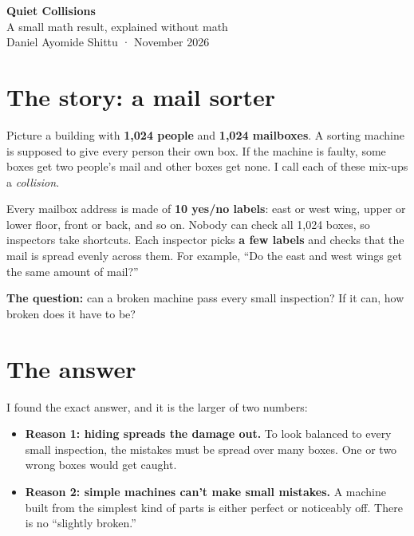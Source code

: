 \documentclass[11pt]{article}
\begin{document}
\pagestyle{empty}

{\LARGE\bfseries Quiet Collisions}\\[3pt]
{\large A small math result, explained without math}\\[2pt]
{\small Daniel Ayomide Shittu \;·\; November 2026}

\vspace{6pt}
\section*{The story: a mail sorter}

Picture a building with \textbf{1{,}024 people} and \textbf{1{,}024 mailboxes}.
A sorting machine is supposed to give every person their own box. If the
machine is faulty, some boxes get two people's mail and other boxes get none.
I call each of these mix-ups a \emph{collision}.

Every mailbox address is made of \textbf{10 yes/no labels}: east or west wing,
upper or lower floor, front or back, and so on. Nobody can check all 1{,}024
boxes, so inspectors take shortcuts. Each inspector picks \textbf{a few labels}
and checks that the mail is spread evenly across them. For example, ``Do the
east and west wings get the same amount of mail?''

\textbf{The question:} can a broken machine pass every small inspection? If it
can, how broken does it have to be?

\section*{The answer}

I found the exact answer, and it is the larger of two numbers:

\begin{center}
\end{center}

\begin{itemize}[leftmargin=1.4em, itemsep=3pt]
\item \textbf{Reason 1: hiding spreads the damage out.} To look balanced to
every small inspection, the mistakes must be spread over many boxes. One or
two wrong boxes would get caught.
\item \textbf{Reason 2: simple machines can't make small mistakes.} A machine
built from the simplest kind of parts is either perfect or noticeably off.
There is no ``slightly broken.''
\end{itemize}
\end{document}
